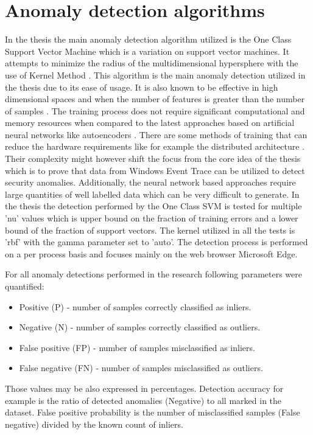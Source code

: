 \documentclass[a4paper,twoside,12pt]{book}
\begin{document}
\section{Anomaly detection algorithms}
In the thesis the main anomaly detection algorithm utilized is the One Class Support 
Vector Machine which is a variation on support vector machines. It attempts to minimize 
the radius of the multidimensional hypersphere with the use of Kernel Method \cite{bib:ocsvm}. 
This algorithm is the main anomaly detection utilized in the thesis due to its ease of
usage. It is also known to be effective in high dimensional spaces and when 
the number of features is greater than the number of samples \cite{bib:svms}. The training process 
does not require significant computational and memory resources when compared to the latest
approaches based on artificial neural networks like autoencoders \cite{bib:autoencoder}. There are
some methods of training that can reduce the hardware requirements like for example the distributed architecture
\cite{bib:autoencoderDist}. Their complexity might however shift the focus from the core idea 
of the thesis which is to prove that data from Windows Event Trace can be utilized to detect security
anomalies. Additionally, the neural network based approaches require large quantities of well labelled
data which can be very difficult to generate. In the thesis the detection performed by the One Class SVM 
is tested for multiple 'nu' values which is upper bound on the fraction of training errors and a lower bound of the 
fraction of support vectors\cite{bib:skocsvm}. The kernel utilized in all the tests is 'rbf' with
the gamma parameter set to 'auto'. The detection process is performed 
on a per process basis and focuses mainly on the web browser Microsoft Edge. 

For all anomaly detections performed in the research following parameters were quantified:
\begin{itemize}
	\item Positive (P) - number of samples correctly classified as inliers.
	\item Negative (N) - number of samples correctly classified as outliers.
	\item False positive (FP) - number of samples misclassified as inliers. 
	\item False negative (FN) - number of samples misclassified as outliers.
\end{itemize}

Those values may be also expressed in percentages. Detection accuracy for example is the ratio
of detected anomalies (Negative) to all marked in the dataset. False positive probability is 
the number of misclassified samples (False negative) divided by the known count of inliers.  
\end{document}
